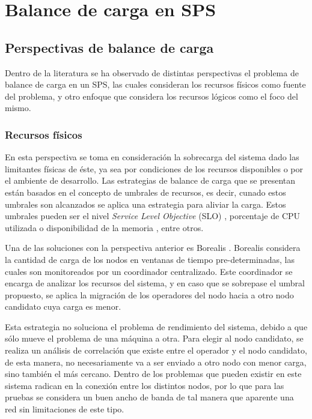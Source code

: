 \chapter{Balance de carga en SPS}
\label{cap:estadoDelArte}

\section{Perspectivas de balance de carga}
\label{sec:perspectivasBC}
Dentro de la literatura se ha observado de distintas perspectivas el problema de balance de carga en un SPS, las cuales consideran los recursos físicos como fuente del problema, y otro enfoque que considera los recursos lógicos como el foco del mismo.

\subsection{Recursos físicos}
\label{subsec:recFisicosBC}
En esta perspectiva se toma en consideración la sobrecarga del sistema dado las limitantes físicas de éste, ya sea por condiciones de los recursos disponibles o por el ambiente de desarrollo. Las estrategias de balance de carga que se presentan están basados en el concepto de umbrales de recursos, es decir, cunado estos umbrales son alcanzados se aplica una estrategia para aliviar la carga. Estos umbrales pueden ser el nivel \textit{Service Level Objective} (SLO) \citep{sturm2000foundations}, porcentaje de CPU utilizada o disponibilidad de la memoria \citep{Dong06schedulingalgorithms}, entre otros.

Una de las soluciones con la perspectiva anterior es Borealis \citep{XingZH05}. Borealis considera la cantidad de carga de los nodos en ventanas de tiempo pre-determinadas, las cuales son monitoreados por un coordinador centralizado. Este coordinador se encarga de analizar los recursos del sistema, y en caso que se sobrepase el umbral propuesto, se aplica la migración de los operadores del nodo hacia a otro nodo candidato cuya carga es menor.

Esta estrategia no soluciona el problema de rendimiento del sistema, debido a que sólo mueve el problema de una máquina a otra. Para elegir al nodo candidato, se realiza un análisis de correlación que existe entre el operador y el nodo candidato, de esta manera, no necesariamente va a ser enviado a otro nodo con menor carga, sino también el más cercano. Dentro de los problemas que pueden existir en este sistema radican en la conexión entre los distintos nodos, por lo que para las pruebas se considera un buen ancho de banda de tal manera que aparente una red sin limitaciones de este tipo.

